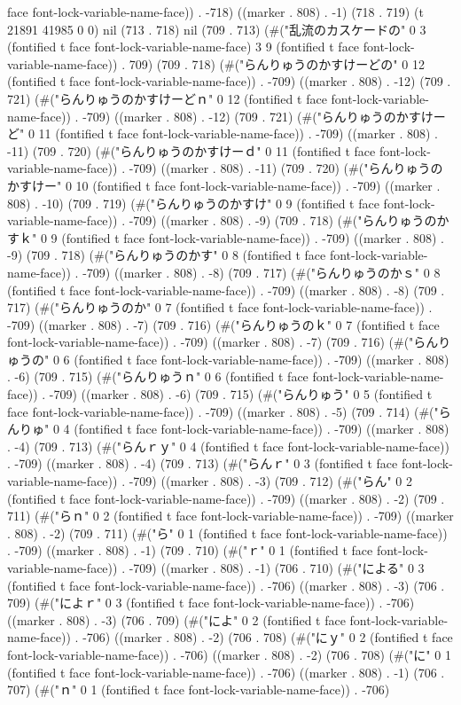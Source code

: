 face font-lock-variable-name-face)) . -718) ((marker . 808) . -1) (718 . 719) (t 21891 41985 0 0) nil (713 . 718) nil (709 . 713) (#("乱流のカスケードの" 0 3 (fontified t face font-lock-variable-name-face) 3 9 (fontified t face font-lock-variable-name-face)) . 709) (709 . 718) (#("らんりゅうのかすけーどの" 0 12 (fontified t face font-lock-variable-name-face)) . -709) ((marker . 808) . -12) (709 . 721) (#("らんりゅうのかすけーどｎ" 0 12 (fontified t face font-lock-variable-name-face)) . -709) ((marker . 808) . -12) (709 . 721) (#("らんりゅうのかすけーど" 0 11 (fontified t face font-lock-variable-name-face)) . -709) ((marker . 808) . -11) (709 . 720) (#("らんりゅうのかすけーｄ" 0 11 (fontified t face font-lock-variable-name-face)) . -709) ((marker . 808) . -11) (709 . 720) (#("らんりゅうのかすけー" 0 10 (fontified t face font-lock-variable-name-face)) . -709) ((marker . 808) . -10) (709 . 719) (#("らんりゅうのかすけ" 0 9 (fontified t face font-lock-variable-name-face)) . -709) ((marker . 808) . -9) (709 . 718) (#("らんりゅうのかすｋ" 0 9 (fontified t face font-lock-variable-name-face)) . -709) ((marker . 808) . -9) (709 . 718) (#("らんりゅうのかす" 0 8 (fontified t face font-lock-variable-name-face)) . -709) ((marker . 808) . -8) (709 . 717) (#("らんりゅうのかｓ" 0 8 (fontified t face font-lock-variable-name-face)) . -709) ((marker . 808) . -8) (709 . 717) (#("らんりゅうのか" 0 7 (fontified t face font-lock-variable-name-face)) . -709) ((marker . 808) . -7) (709 . 716) (#("らんりゅうのｋ" 0 7 (fontified t face font-lock-variable-name-face)) . -709) ((marker . 808) . -7) (709 . 716) (#("らんりゅうの" 0 6 (fontified t face font-lock-variable-name-face)) . -709) ((marker . 808) . -6) (709 . 715) (#("らんりゅうｎ" 0 6 (fontified t face font-lock-variable-name-face)) . -709) ((marker . 808) . -6) (709 . 715) (#("らんりゅう" 0 5 (fontified t face font-lock-variable-name-face)) . -709) ((marker . 808) . -5) (709 . 714) (#("らんりゅ" 0 4 (fontified t face font-lock-variable-name-face)) . -709) ((marker . 808) . -4) (709 . 713) (#("らんｒｙ" 0 4 (fontified t face font-lock-variable-name-face)) . -709) ((marker . 808) . -4) (709 . 713) (#("らんｒ" 0 3 (fontified t face font-lock-variable-name-face)) . -709) ((marker . 808) . -3) (709 . 712) (#("らん" 0 2 (fontified t face font-lock-variable-name-face)) . -709) ((marker . 808) . -2) (709 . 711) (#("らｎ" 0 2 (fontified t face font-lock-variable-name-face)) . -709) ((marker . 808) . -2) (709 . 711) (#("ら" 0 1 (fontified t face font-lock-variable-name-face)) . -709) ((marker . 808) . -1) (709 . 710) (#("ｒ" 0 1 (fontified t face font-lock-variable-name-face)) . -709) ((marker . 808) . -1) (706 . 710) (#("による" 0 3 (fontified t face font-lock-variable-name-face)) . -706) ((marker . 808) . -3) (706 . 709) (#("によｒ" 0 3 (fontified t face font-lock-variable-name-face)) . -706) ((marker . 808) . -3) (706 . 709) (#("によ" 0 2 (fontified t face font-lock-variable-name-face)) . -706) ((marker . 808) . -2) (706 . 708) (#("にｙ" 0 2 (fontified t face font-lock-variable-name-face)) . -706) ((marker . 808) . -2) (706 . 708) (#("に" 0 1 (fontified t face font-lock-variable-name-face)) . -706) ((marker . 808) . -1) (706 . 707) (#("ｎ" 0 1 (fontified t face font-lock-variable-name-face)) . -706) 